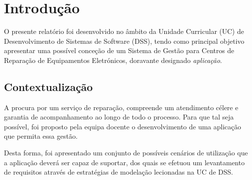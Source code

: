 \documentclass[a4paper,12pt]{scrreprt}
\begin{document}
\pagebreak



\renewcommand{\contentsname}{Índice}

\tableofcontents

\pagebreak

\listoffigures

\pagebreak







\chapter{Introdução}
O presente relatório foi desenvolvido no âmbito da Unidade Curricular (UC) de Desenvolvimento de Sistemas de Software (DSS),
tendo como principal objetivo apresentar uma possível conceção de um Sistema de Gestão para Centros de Reparação de Equipamentos Eletrónicos, doravante designado \textit{aplicação}.

\section{Contextualização}
A procura por um serviço de reparação, compreende um atendimento célere e garantia de acompanhamento ao longo de todo o processo.
Para que tal seja possível, foi proposto pela equipa docente o desenvolvimento de uma aplicação que permita essa gestão.

Desta forma, foi apresentado um conjunto de possíveis cenários de utilização que a aplicação deverá ser capaz de suportar,
dos quais se efetuou um levantamento de requisitos através de estratégias de modelação lecionadas na UC de DSS.
\end{document}
